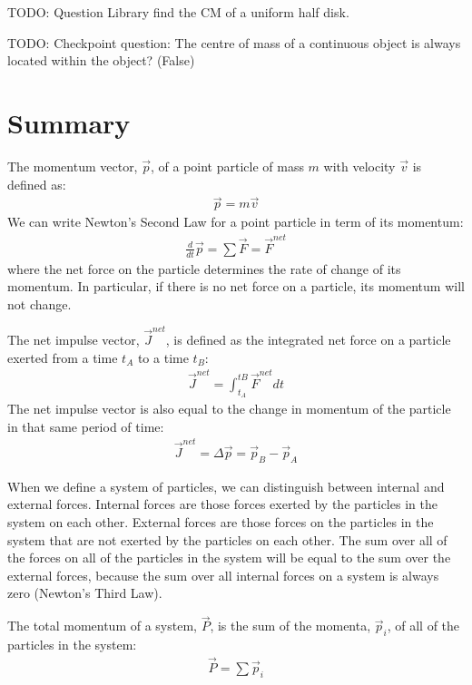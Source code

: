 TODO: Question Library find the CM of a uniform half disk.

TODO: Checkpoint question: The centre of mass of a continuous object is always located within the object? (False)

\newpage
\section{Summary}

\begin{chapterSummary}{
The momentum vector, $\vec p$, of a point particle of mass $m$ with velocity $\vec v$ is defined as:
\begin{align*}
\vec p = m\vec v
\end{align*}
We can write Newton's Second Law for a point particle in term of its momentum:
\begin{align*}
\frac{d}{dt}\vec p = \sum \vec F = \vec F^{net}
\end{align*}
where the net force on the particle determines the rate of change of its momentum. In particular, if there is no net force on a particle, its momentum will not change.

The net impulse vector, $\vec J^{net}$, is defined as the integrated net force on a particle exerted from a time $t_A$ to a time $t_B$:
\begin{align*}
\vec J^{net} = \int_{t_A}^{tB} \vec F^{net} dt
\end{align*}
The net impulse vector is also equal to the change in momentum of the particle in that same period of time:
\begin{align*}
\vec J^{net} = \Delta \vec p = \vec p_B - \vec p_A
\end{align*}

When we define a system of particles, we can distinguish between internal and external forces. Internal forces are those forces exerted by the particles in the system on each other. External forces are those forces on the particles in the system that are not exerted by the particles on each other. The sum over all of the forces on all of the particles in the system will be equal to the sum over the external forces, because the sum over all internal forces on a system is always zero (Newton's Third Law).

The total momentum of a system, $\vec P$, is the sum of the momenta, $\vec p_i$, of all of the particles in the system:
\begin{align*}
\vec P = \sum \vec p_i
\end{align*}

}
\end{chapterSummary}
